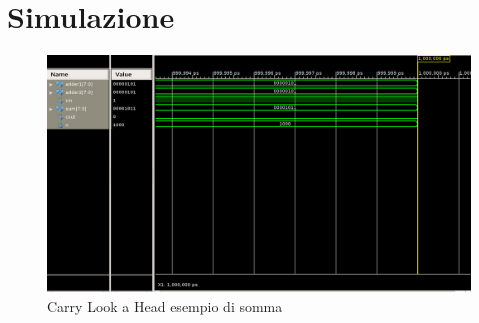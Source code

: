 %

\section{Simulazione}

\begin{figure}[H]
	\centering
\includegraphics[scale=0.5]{esercizio09/images/carry_look_a_head_testbench.png}
	\caption{Carry Look a Head esempio di somma}
\end{figure}%

